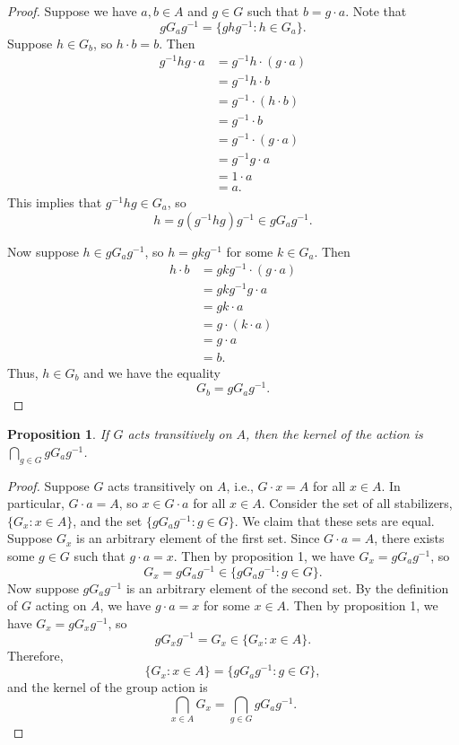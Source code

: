\documentclass[12pt]{article}
\newtheorem{proposition}{Proposition}
\newcommand{\ds}{\displaystyle}
\newcommand{\<}{\left\langle} %
\renewcommand{\>}{\right\rangle} %
\begin{document}
\begin{proof}
    Suppose we have $a,b\in A$ and $g\in G$ such that $b = g\cdot a$. Note that
    \[gG_ag^{-1} = \{ghg^{-1} : h\in G_a\}.\]
    Suppose $h\in G_b$, so $h \cdot b = b$. Then
    \begin{align*}
        g^{-1}hg \cdot a 
            &= g^{-1}h \cdot (g \cdot a) \\
            &= g^{-1}h \cdot b\\
            &= g^{-1} \cdot (h \cdot b)\\
            &= g^{-1} \cdot b\\
            &= g^{-1} \cdot (g \cdot a)\\
            &= g^{-1}g \cdot a\\
            &= 1 \cdot a\\
            &= a.
    \end{align*}
    This implies that $g^{-1}hg \in G_a$, so
    \[h = g(g^{-1}hg)g^{-1} \in gG_ag^{-1}.\]
    
    Now suppose $h \in gG_ag^{-1}$, so $h = gkg^{-1}$ for some $k\in G_a$. Then
    \begin{align*}
        h \cdot b
            &= gkg^{-1} \cdot (g\cdot a) \\
            &= gkg^{-1}g \cdot a \\
            &= gk \cdot a \\
            &= g \cdot (k\cdot a) \\
            &= g \cdot a\\
            &= b.
        \end{align*}
        Thus, $h\in G_b$ and we have the equality
        \[G_b = gG_ag^{-1}.\]
    
\end{proof}

\newpage
\begin{proposition}
    If $G$ acts transitively on $A$, then the kernel of the action is $\ds\bigcap_{g\in G} gG_ag^{-1}$.
\end{proposition}

\begin{proof}
    Suppose $G$ acts transitively on $A$, i.e., $G\cdot x = A$ for all $x\in A$. In particular, $G\cdot a = A$, so $x\in G\cdot a$ for all $x\in A$. Consider the set of all stabilizers, $\{G_x : x\in A\}$, and the set $\{gG_ag^{-1} : g\in G\}$. We claim that these sets are equal. Suppose $G_x$ is an arbitrary element of the first set. Since $G\cdot a = A$, there exists some $g\in G$ such that $g\cdot a = x$. Then by proposition 1, we have $G_x = gG_ag^{-1}$, so
    \[G_x = gG_ag^{-1} \in \{gG_ag^{-1} : g\in G\}.\]
    Now suppose $gG_ag^{-1}$ is an arbitrary element of the second set. By the definition of $G$ acting on $A$, we have $g\cdot a = x$ for some $x\in A$. Then by proposition 1, we have $G_x = gG_xg^{-1}$, so
    \[gG_xg^{-1} = G_x \in \{G_x : x\in A\}.\]
    Therefore,
    \[\{G_x : x\in A\} = \{gG_ag^{-1} : g\in G\},\]
    and the kernel of the group action is
    \[\bigcap_{x\in A} G_x = \bigcap_{g\in G} gG_ag^{-1}.\]
    
\end{proof}
\end{document}
